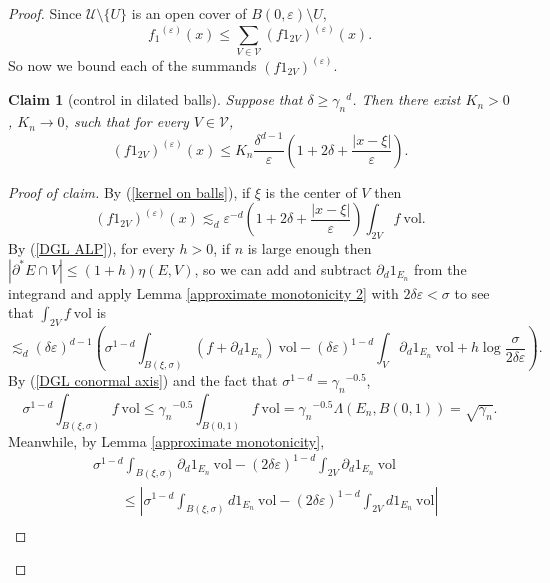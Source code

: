 \documentclass[reqno,12pt,letterpaper]{amsart}
\newcommand{\vol}{\mathrm{vol}}
\newtheorem{claim}[theorem]{Claim}
\theoremstyle{definition}
\numberwithin{equation}{section}
\begin{document}
\begin{proof}
Since $\mathcal U \setminus \{U\}$ is an open cover of $B(0, \varepsilon) \setminus U$,
$${f_1}^{(\varepsilon)}(x) \leq \sum_{V \in \mathcal V} (f1_{2V})^{(\varepsilon)}(x).$$
So now we bound each of the summands $(f1_{2V})^{(\varepsilon)}$.

\begin{claim}[control in dilated balls]\label{dilated balls claim}
Suppose that $\delta \geq {\gamma_n}^d$.
Then there exist $K_n > 0$, $K_n \to 0$, such that for every $V \in \mathcal V$,
$$(f1_{2V})^{(\varepsilon)}(x) \leq K_n \frac{\delta^{d - 1}}{\varepsilon}\left(1 + 2\delta + \frac{|x - \xi|}{\varepsilon}\right).$$
\end{claim}
\begin{proof}[Proof of claim]
By (\ref{kernel on balls}), if $\xi$ is the center of $V$ then
\begin{equation}\label{dilated balls 0}
(f1_{2V})^{(\varepsilon)}(x) \lesssim_d \varepsilon^{-d} \left(1 + 2\delta + \frac{|x - \xi|}{\varepsilon}\right) \int_{2V} f ~\vol.
\end{equation}
By (\ref{DGL ALP}), for every $h > 0$, if $n$ is large enough then $|\partial^* E \cap V| \leq (1 + h)\eta(E, V)$, so we can add and subtract $\partial_d 1_{E_n}$ from the integrand and apply Lemma \ref{approximate monotonicity 2} with $2\delta \varepsilon < \sigma$ to see that $\int_{2V} f ~\vol$ is
\begin{equation}\label{dilated balls 1}
\lesssim_d (\delta \varepsilon)^{d - 1} \left(\sigma^{1 - d} \int_{B(\xi, \sigma)} (f + \partial_d 1_{E_n}) ~\vol - (\delta\varepsilon)^{1 - d} \int_V \partial_d 1_{E_n} ~\vol + h\log\frac{\sigma}{2 \delta\varepsilon}\right).
\end{equation}
By (\ref{DGL conormal axis}) and the fact that $\sigma^{1 - d} = {\gamma_n}^{-0.5}$,
\begin{equation}\label{DGL conormal axis consequence}
\sigma^{1 - d}\int_{B(\xi, \sigma)} f ~\vol \leq {\gamma_n}^{-0.5} \int_{B(0, 1)} f ~\vol = {\gamma_n}^{-0.5} \Lambda(E_n, B(0, 1)) = \sqrt{\gamma_n}.
\end{equation}
Meanwhile, by Lemma \ref{approximate monotonicity},
\begin{align*}
&\sigma^{1 - d} \int_{B(\xi, \sigma)} \partial_d1_{E_n} ~\vol - (2\delta\varepsilon)^{1 - d} \int_{2V} \partial_d1_{E_n} ~\vol\\
& \qquad \leq \left|\sigma^{1 - d} \int_{B(\xi, \sigma)} d1_{E_n} ~\vol - (2\delta\varepsilon)^{1 - d} \int_{2V} d1_{E_n} ~\vol\right|\\

\end{align*}
\end{proof}
\end{proof}
\end{document}
